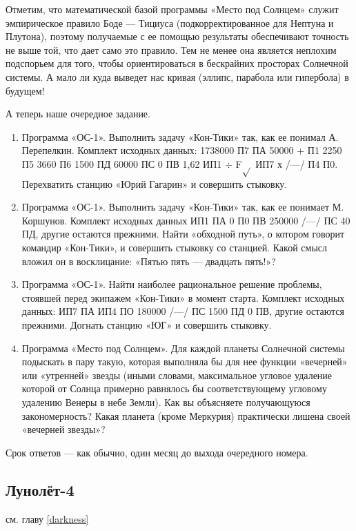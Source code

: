 \documentclass[11pt,a4paper,oneside]{article}
\begin{document}
Отметим, что математической базой программы «Место под Солнцем» служит эмпирическое правило Боде — Тициуса (подкорректированное для Нептуна и Плутона), поэтому получаемые с ее помощью результаты обеспечивают точность не выше той, что дает само это правило. Тем не менее она является неплохим подспорьем для того, чтобы ориентироваться в бескрайних просторах Солнечной системы. А мало ли куда выведет нас кривая (эллипс, парабола или гипербола) в будущем!

А теперь наше очередное задание.

\begin{enumerate}
\item Программа «ОС-1». Выполнить задачу «Кон-Тики» так, как ее понимал А. Перепелкин. Комплект исходных данных: 1738000 П7 ПА 50000 + П1 2250 П5 3660 П6 1500 ПД 60000 ПС 0 ПВ 1,62 ИП1 $\div$ F$\sqrt{}$ ИП7 х /—/ П4 П0. Перехватить станцию «Юрий Гагарин» и совершить стыковку.
\item Программа «ОС-1». Выполнить задачу «Кон-Тики» так, как ее понимает М. Коршунов. Комплект исходных данных ИП1 ПА 0 П0 ПВ 250000 /—/ ПС 40 ПД, другие остаются прежними. Найти «обходной путь», о котором говорит командир «Кон-Тики», и совершить стыковку со станцией. Какой смысл вложил он в восклицание: «Пятью пять — двадцать пять!»?
\item Программа «ОС-1». Найти наиболее рациональное решение проблемы, стоявшей перед экипажем «Кон-Тики» в момент старта. Комплект исходных данных: ИП7 ПА ИП4 ПО 180000 /—/ ПС 1500 ПД 0 ПВ, другие остаются прежними. Догнать станцию «ЮГ» и совершить стыковку.
\item Программа «Место под Солнцем». Для каждой планеты Солнечной системы подыскать в пару такую, которая выполняла бы для нее функции «вечерней» или «утренней» звезды (иными словами, максимальное угловое удаление которой от Солнца примерно равнялось бы соответствующему угловому удалению Венеры в небе Земли). Как вы объясняете получающуюся закономерность? Какая планета (кроме Меркурия) практически лишена своей «вечерней звезды»?
\end{enumerate}

Срок ответов — как обычно, один месяц до выхода очередного номера.

\subsection{Лунолёт-4}
см. главу \ref{darkness}
\end{document}
